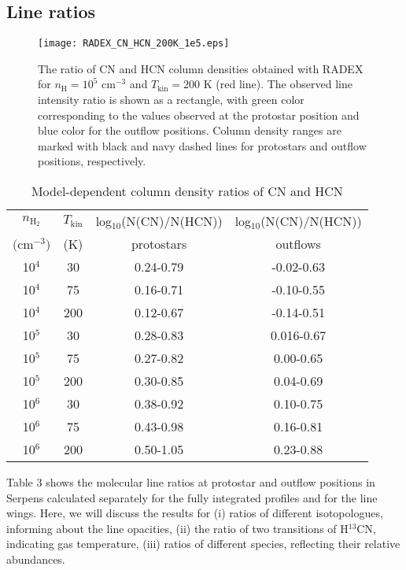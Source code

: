 \documentclass{aa}
\begin{document}
\subsection{Line ratios}
\begin{figure} 
\centering 
\texttt{[image: RADEX\_CN\_HCN\_200K\_1e5.eps]}
\caption{The ratio of CN and HCN column densities obtained with RADEX for $n_\mathrm{H} = 10^5$ cm$^{-3}$ and
$T_\mathrm{kin} = 200$ K (red line). The observed line intensity ratio is
shown as a rectangle, with green color corresponding to the values observed at the 
protostar position and blue color for the outflow positions. Column density ranges are marked with black and navy dashed lines for protostars and outflow positions, respectively.} 
\label{model} 
\end{figure}
\begin{table} \caption{Model-dependent column density ratios of CN and HCN }     
 \centering                     
  \begin{tabular}{c c c c} 
  \hline\hline $n_\mathrm{H_2}$ & $T_\mathrm{kin}$ &
log$_{10}$(N(CN)/N(HCN)) &
log$_{10}$(N(CN)/N(HCN)) \\ 
$($cm$^{-3})$ & (K) & protostars & outflows \\ 
\hline 10$^{4}$ & 30 & 0.24-0.79 & -0.02-0.63  \\
 10$^{4}$ & 75 & 0.16-0.71 & -0.10-0.55 \\
  10$^{4}$ & 200 & 0.12-0.67 & -0.14-0.51 \\ 
  10$^{5}$ & 30 & 0.28-0.83 & 0.016-0.67 \\
   10$^{5}$ & 75 & 0.27-0.82 & 0.00-0.65 \\
    10$^{5}$ & 200 & 0.30-0.85 & 0.04-0.69 \\ 
    10$^{6}$ & 30 & 0.38-0.92 & 0.10-0.75 \\ 
    10$^{6}$ & 75 & 0.43-0.98 & 0.16-0.81 \\ 
    10$^{6}$ & 200 & 0.50-1.05 & 0.23-0.88\\
     \hline 
     \end{tabular} 
     \end{table}
Table 3 shows the molecular line ratios at protostar and outflow positions in Serpens 
calculated separately for the fully integrated profiles and for the line wings. 
Here, we will discuss the results for (i) ratios of different isotopologues, informing 
about the line opacities, (ii) the ratio of two transitions of H$^{13}$CN,
indicating gas temperature, (iii) ratios of different species, reflecting 
their relative abundances.
\end{document}
